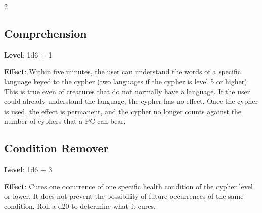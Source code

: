 \begin{multicols}{2}

\subsection{Comprehension}

\textbf{Level}: 1d6 + 1

\textbf{Effect}: Within five minutes, the user can understand the words of a specific language keyed to the cypher (two languages if the cypher is level 5 or higher). This is true even of creatures that do not normally have a language. If the user could already understand the language, the cypher has no effect. Once the cypher is used, the effect is permanent, and the cypher no longer counts against the number of cyphers that a PC can bear.

\subsection{Condition Remover}

\textbf{Level}: 1d6 + 3

\textbf{Effect}: Cures one occurrence of one specific health condition of the cypher level or lower. It does not prevent the possibility of future occurrences of the same condition. Roll a d20 to determine what it cures.

\end{multicols}

